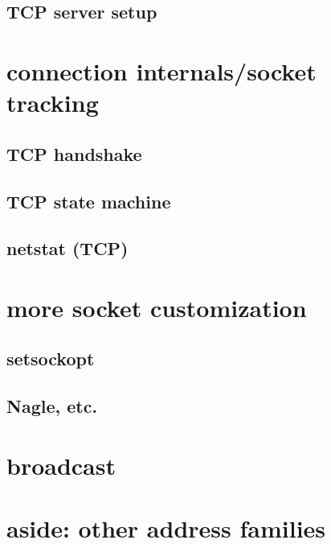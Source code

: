 \subsection{TCP server setup}


\section{connection internals/socket tracking}
\subsection{TCP handshake}


\subsection{TCP state machine}


\subsection{netstat (TCP)}


\section{more socket customization}
\subsection{setsockopt}


\subsection{Nagle, etc.}


\section{broadcast}


\section{aside: other address families}


